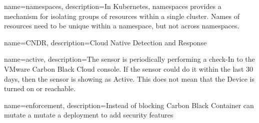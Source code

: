 {
	name={namespaces},
	description={In Kubernetes, namespaces provides a mechanism for isolating groups of resources within a single cluster. Names of resources need to be unique within a namespace, but not across namespaces.}
}

{
	name={CNDR},
	description={Cloud Native Detection and Response}
}

{
	name={active},
	description={The sensor is periodically performing a check-In to the VMware Carbon Black Cloud console. If the sensor could do it within the last 30 days, then the sensor is showing as Active. This does not mean that the Device is turned on or reachable.}
}

{
	name={enforcement},
	description={Instead of blocking Carbon Black Container can mutate a mutate a deployment to add security features}
}
